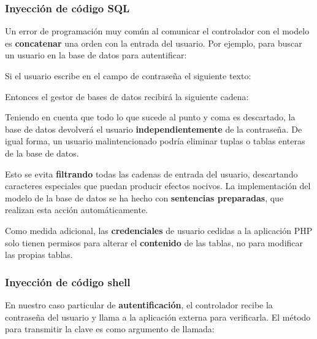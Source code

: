 \subsubsection{Inyección de código SQL}

Un error de programación muy común al comunicar el controlador con el modelo es \textbf{concatenar} una orden con la entrada del usuario. Por ejemplo, para buscar un usuario en la base de datos para autentificar:

\begin{center}
\end{center}

Si el usuario escribe en el campo de contraseña el siguiente texto:

\begin{center}
\end{center}

Entonces el gestor de bases de datos recibirá la siguiente cadena:

\begin{center}
\end{center}

Teniendo en cuenta que todo lo que sucede al punto y coma es descartado, la base de datos devolverá el usuario \textbf{independientemente} de la contraseña. De igual forma, un usuario malintencionado podría eliminar tuplas o tablas enteras de la base de datos.

Esto se evita \textbf{filtrando} todas las cadenas de entrada del usuario, descartando caracteres especiales que puedan producir efectos nocivos. La implementación del modelo de la base de datos se ha hecho con \textbf{sentencias preparadas}, que realizan esta acción automáticamente.

Como medida adicional, las \textbf{credenciales} de usuario cedidas a la aplicación \acrshort{PHP} solo tienen permisos para alterar el \textbf{contenido} de las tablas, no para modificar las propias tablas.

\subsubsection{Inyección de código shell}

En nuestro caso particular de \textbf{autentificación}, el controlador recibe la contraseña del usuario y llama a la aplicación externa para verificarla. El método para transmitir la clave es como argumento de llamada:

